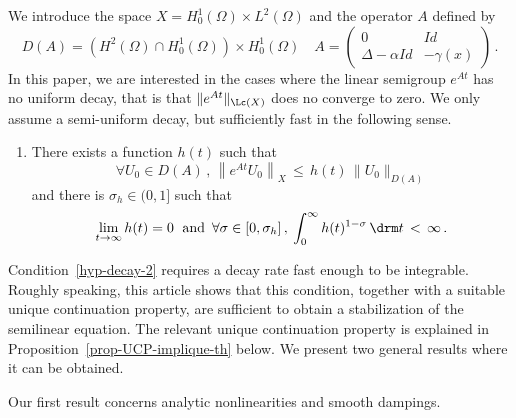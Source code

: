 We introduce the space $X=H^1_0(\Omega)\times L^2(\Omega)$ and the operator $A$ defined by
\[
D(A)=\left(H^2(\Omega)\cap H^1_0(\Omega)\right)\times H^1_0(\Omega)\quad
A =
\begin{pmatrix}
0 & Id \\
\Delta-\alpha Id & -\gamma(x)
\end{pmatrix}\,.
\]
In this paper, we are interested in the cases where the linear semigroup $e^{At}$ has no uniform decay, that is that $\|e^{At}\|_{\Lc(X)}$ does no converge to zero. We only assume a semi-uniform decay, but sufficiently fast in the following sense.

\begingroup
\begin{enumerate}\romanenumi
\setcounter{enumi}{4}
\item \label{listintro1.5}There exists a function $h(t)$ such that
\begin{equation}\label{hyp-decay-1}
\forall U_0\in D(A)\,,\,\left\|e^{At}U_0\right\|_X \, \leq \, h(t)\,\|U_0\|_{D(A)}
\end{equation}
and there is $\sigma_h\in(0,1]$ such that
\begin{equation}\label{hyp-decay-2}
\lim_{t\rightarrow \infty}h(t)=0\;\text{ and }\,
\forall \sigma\in[0,\sigma_h]\,,\:\int_0^\infty h(t)^{1-\sigma}\,\drm t\,<\,\infty\,.
\end{equation}
\end{enumerate}
\endgroup
Condition~\eqref{hyp-decay-2} requires a decay rate fast enough to be integrable. Roughly speaking, this article shows that this condition, together with a suitable unique continuation property, are sufficient to obtain a stabilization of the semilinear equation. The relevant unique continuation property is explained in Proposition~\ref{prop-UCP-implique-th} below. We present two general results where it can be obtained.

Our first result concerns analytic nonlinearities and smooth dampings.

